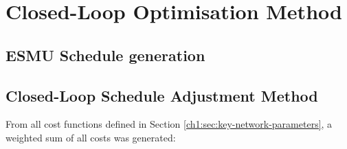 \section{Closed-Loop Optimisation Method}
\label{ch1:sec:closed-loop-optimisation-method}

\subsection{ESMU Schedule generation}


\subsection{Closed-Loop Schedule Adjustment Method}

From all cost functions defined in Section \ref{ch1:sec:key-network-parameters}, a weighted sum of all costs was generated:


